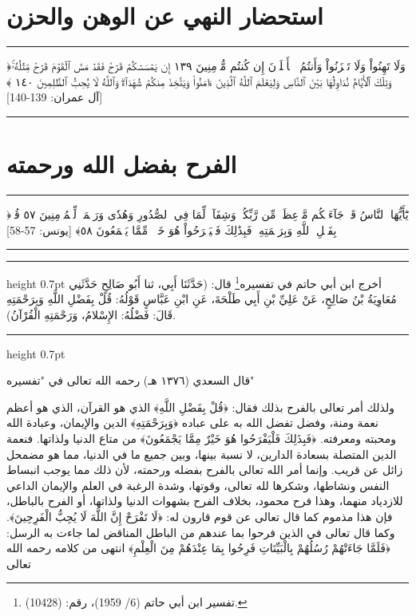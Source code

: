 \documentclass[12pt,openany]{book}
\newenvironment{quranblock}
  {\par\medskip\begin{center}\begin{minipage}{0.92\linewidth}\centering\quranfont\large\color{ink}\hrule\vspace{0.65em}}
  {\vspace{0.65em}\hrule\end{minipage}\end{center}\medskip}
\newenvironment{hadithblock}
  {\par\medskip\noindent\begin{minipage}{\linewidth}\hrule height 0.7pt \vspace{0.6em}\small}
  {\vspace{0.4em}\hrule height 0.7pt\end{minipage}\par\medskip}
\newenvironment{sourceintro}
  {\par\medskip\noindent\titlefont\color{gold}}
  {\par\smallskip}
\begin{document}
\section{استحضار النهي عن الوهن والحزن}
\begin{quranblock}
﴿وَلَا تَهِنُواْ وَلَا تَحۡزَنُواْ وَأَنتُمُ ٱلۡأَعۡلَوۡنَ إِن كُنتُم مُّؤۡمِنِينَ ١٣٩ إِن يَمۡسَسۡكُمۡ ‌قَرۡحٞ فَقَدۡ مَسَّ ٱلۡقَوۡمَ ‌قَرۡحٞ مِّثۡلُهُۥۚ وَتِلۡكَ ٱلۡأَيَّامُ نُدَاوِلُهَا بَيۡنَ ٱلنَّاسِ وَلِيَعۡلَمَ ٱللَّهُ ٱلَّذِينَ ءَامَنُواْ وَيَتَّخِذَ مِنكُمۡ شُهَدَآءَۗ وَٱللَّهُ لَا يُحِبُّ ٱلظَّٰلِمِينَ ١٤٠ ﴾ [آل عمران: 139-140]
\end{quranblock}

\section{الفرح بفضل الله ورحمته}
\begin{quranblock}
﴿يَٰٓأَيُّهَا ٱلنَّاسُ قَدۡ جَآءَتۡكُم مَّوۡعِظَةٞ مِّن رَّبِّكُمۡ وَشِفَآءٞ لِّمَا فِي ٱلصُّدُورِ وَهُدٗى وَرَحۡمَةٞ لِّلۡمُؤۡمِنِينَ ٥٧ قُلۡ بِفَضۡلِ ٱللَّهِ ‌وَبِرَحۡمَتِهِۦ فَبِذَٰلِكَ فَلۡيَفۡرَحُواْ هُوَ خَيۡرٞ مِّمَّا يَجۡمَعُونَ ٥٨﴾ [يونس: 57-58]
\end{quranblock}

\begin{hadithblock}
أخرج ابن أبي حاتم في تفسيره\footnote{تفسير ابن أبي حاتم (6/ 1959)، رقم: (10428).} قال: (حَدَّثَنَا أَبِي، ثنا أَبُو صَالِحٍ حَدَّثَنِي مُعَاوِيَةُ بْنُ صَالِحٍ، عَنْ ‌عَلِيِّ بْنِ أَبِي طَلْحَةَ، عَنِ ابْنِ ‌عَبَّاسٍ قَوْلُهُ: ‌قُلْ ‌بِفَضْلِ ‌اللَّهِ ‌وَبِرَحْمَتِهِ قَالَ: فَضْلُهُ: الإِسْلامُ، وَرَحْمَتِهِ الْقُرْآنُ).
\end{hadithblock}

\begin{sourceintro}قال السعدي (١٣٧٦ هـ) رحمه الله تعالى في "تفسيره"\end{sourceintro}

ولذلك أمر تعالى بالفرح بذلك فقال‏:‏ ‏﴿‏قُلْ بِفَضْلِ اللَّهِ‏﴾‏ الذي هو القرآن، الذي هو أعظم نعمة ومنة، وفضل تفضل الله به على عباده ‏﴿‏وَبِرَحْمَتِهِ‏﴾‏ الدين والإيمان، وعبادة الله ومحبته ومعرفته‏.‏ ‏﴿‏فَبِذَلِكَ فَلْيَفْرَحُوا هُوَ خَيْرٌ مِمَّا يَجْمَعُونَ‏﴾‏ من متاع الدنيا ولذاتها‏.‏ فنعمة الدين المتصلة بسعادة الدارين، لا نسبة بينها، وبين جميع ما في الدنيا، مما هو مضمحل زائل عن قريب‏.‏ وإنما أمر الله تعالى بالفرح بفضله ورحمته، لأن ذلك مما يوجب انبساط النفس ونشاطها، وشكرها لله تعالى، وقوتها، وشدة الرغبة في العلم والإيمان الداعي للازدياد منهما، وهذا فرح محمود، بخلاف الفرح بشهوات الدنيا ولذاتها، أو الفرح بالباطل، فإن هذا مذموم كما قال ‏‏تعالى عن‏ قوم قارون له‏:‏ ‏﴿‏لَا تَفْرَحْ إِنَّ اللَّهَ لَا يُحِبُّ الْفَرِحِينَ‏﴾‏‏.‏ وكما قال تعالى في الذين فرحوا بما عندهم من الباطل المناقض لما جاءت به الرسل‏:‏ ‏﴿‏فَلَمَّا جَاءَتْهُمْ رُسُلُهُمْ بِالْبَيِّنَاتِ فَرِحُوا بِمَا عِنْدَهُمْ مِنَ الْعِلْمِ‏﴾‏ انتهى من كلامه رحمه الله تعالى
\end{document}
